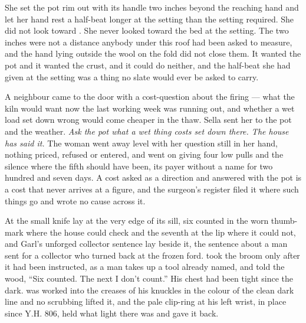 She set the pot rim out with its handle two inches beyond the reaching hand and let her hand rest a half-beat longer at the setting than the setting required. She did not look toward . She never looked toward the bed at the setting. The two inches were not a distance anybody under this roof had been asked to measure, and the hand lying outside the wool on the fold did not close them. It wanted the pot and it wanted the crust, and it could do neither, and the half-beat she had given at the setting was a thing no slate would ever be asked to carry.

\scenebreak

A neighbour came to the door with a cost-question about the firing --- what the kiln would want now the last working week was running out, and whether a wet load set down wrong would come cheaper in the thaw. Sella sent her to the pot and the weather. \emph{Ask the pot what a wet thing costs set down there. The house has said it.} The woman went away level with her question still in her hand, nothing priced, refused or entered, and  went on giving four low pulls and the silence where the fifth should have been, its payer without a name for two hundred and seven days. A cost asked as a direction and answered with the pot is a cost that never arrives at a figure, and the surgeon's register filed it where such things go and wrote no cause across it.

At  the small knife lay at the very edge of its sill, six counted in the worn thumb-mark where the house could check and the seventh at the lip where it could not, and Garl's unforged collector sentence lay beside it, the sentence about a man sent for a collector who turned back at the frozen ford.  took the broom only after it had been instructed, as a man takes up a tool already named, and told the wood, “Six counted. The next I don't count.” His chest had been tight since the dark.  was worked into the creases of his knuckles in the colour of the clean dark line and no scrubbing lifted it, and the pale clip-ring at his left wrist, in place since Y.H. 806, held what light there was and gave it back.


